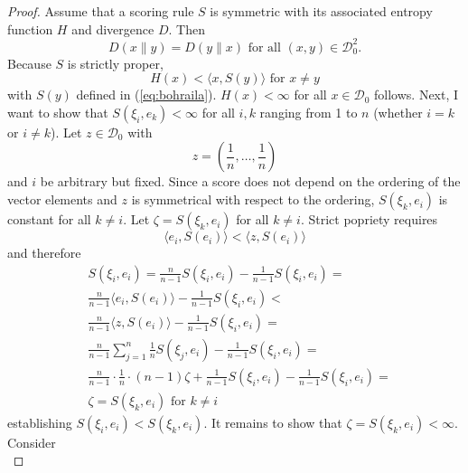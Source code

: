 \documentclass[12pt]{article}
\begin{document}
\begin{proof}
  \label{prf:phahdeif}
Assume that a scoring rule $S$ is symmetric with its associated
entropy function $H$ and divergence $D$. Then
\begin{equation}
  \label{eq:ohtaethu}
  D(x\|y)=D(y\|x)\mbox{ for all }(x,y)\in\mathcal{D}_{0}^{2}.
\end{equation}
Because $S$ is strictly proper,
\begin{equation}
  \label{eq:thojiesh}
  H(x)<\langle{}x,S(y)\rangle\mbox{ for }x\neq{}y
\end{equation}
with $S(y)$ defined in (\ref{eq:bohraila}). $H(x)<\infty$ for all
$x\in\mathcal{D}_{0}$ follows. Next, I want to show that
$S(\xi_{i},e_{k})<\infty$ for all $i,k$ ranging from 1 to $n$ (whether
$i=k$ or $i\neq{}k$). Let $z\in\mathcal{D}_{0}$ with
\begin{equation}
  \label{eq:uubumaim}
  z=\left(\frac{1}{n},{\ldots},\frac{1}{n}\right)
\end{equation}
and $i$ be arbitrary but fixed. Since a score does not depend on
the ordering of the vector elements and $z$ is symmetrical with
respect to the ordering, $S(\xi_{k},e_{i})$ is constant for all
$k\neq{}i$. Let $\zeta=S(\xi_{k},e_{i})$ for all $k\neq{}i$.
Strict popriety requires
\begin{equation}
  \label{eq:phoomahn}
  \langle{}e_{i},S(e_{i})\rangle<\langle{}z,S(e_{i})\rangle
\end{equation}
and therefore
\begin{equation}
  \label{eq:adohghie}
  \begin{split}
  & S(\xi_{i},e_{i})=\frac{n}{n-1}S(\xi_{i},e_{i})-\frac{1}{n-1}S(\xi_{i},e_{i})= \\
  & \frac{n}{n-1}\langle{}e_{i},S(e_{i})\rangle-\frac{1}{n-1}S(\xi_{i},e_{i})< \\
  & \frac{n}{n-1}\langle{}z,S(e_{i})\rangle-\frac{1}{n-1}S(\xi_{i},e_{i})= \\
  & \frac{n}{n-1}\sum_{j=1}^{n}\frac{1}{n}S(\xi_{j},e_{i})-\frac{1}{n-1}S(\xi_{i},e_{i})= \\
  & \frac{n}{n-1}\cdot\frac{1}{n}\cdot(n-1)\zeta+\frac{1}{n-1}S(\xi_{i},e_{i})-\frac{1}{n-1}S(\xi_{i},e_{i})= \\
  & \zeta=S(\xi_{k},e_{i})\mbox{ for }k\neq{}i
  \end{split}
\end{equation}
establishing $S(\xi_{i},e_{i})<S(\xi_{k},e_{i})$. It remains to
show that $\zeta=S(\xi_{k},e_{i})<\infty$.
Consider
\begin{equation}

\end{equation}
\end{proof}
\end{document}
